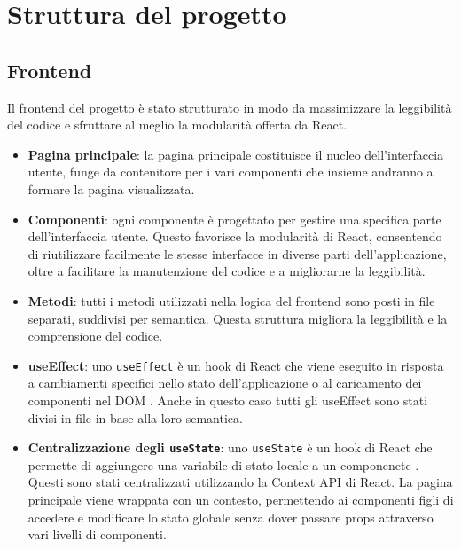 \chapter{Struttura del progetto}
\section{Frontend}
Il frontend del progetto è stato strutturato in modo da massimizzare la leggibilità del codice e sfruttare al meglio 
la modularità offerta da React.

\begin{itemize}
    \item \textbf{Pagina principale}: la pagina principale costituisce il nucleo dell'interfaccia utente,
    funge da contenitore per i vari componenti che insieme andranno a formare la pagina visualizzata. 

    \item \textbf{Componenti}: ogni componente è progettato per gestire una specifica parte dell'interfaccia utente. 
    Questo favorisce la modularità di React, consentendo di riutilizzare facilmente le stesse interfacce in diverse parti dell'applicazione,
    oltre a facilitare la manutenzione del codice e a migliorarne la leggibilità. 

    \item \textbf{Metodi}: tutti i metodi utilizzati nella logica del frontend sono posti in file separati, suddivisi per semantica.
    Questa struttura migliora la leggibilità e la comprensione del codice.
    
    \item \textbf{useEffect}: uno \texttt{useEffect} è un hook di React che viene eseguito in risposta a cambiamenti specifici nello stato 
    dell'applicazione o al caricamento dei componenti nel DOM \cite{reactUseEffect}. Anche in questo caso tutti
    gli useEffect sono stati divisi in file in base alla loro semantica.

    \item \textbf{Centralizzazione degli \texttt{useState}}: uno \texttt{useState} è un hook di React che permette di aggiungere
    una variabile di stato locale a un componenete \cite{reactUseState}. Questi sono stati centralizzati utilizzando la Context API di React. 
    La pagina principale viene wrappata con un contesto, permettendo ai componenti figli di accedere e modificare lo stato globale 
    senza dover passare props attraverso vari livelli di componenti. 
\end{itemize}
\clearpage
